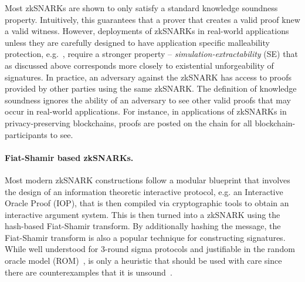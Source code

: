 Most zkSNARKs are shown to only satisfy a standard knowledge soundness property. Intuitively, this guarantees that
a prover that creates a valid proof knew a valid witness. However, deployments of zkSNARKs in real-world applications unless they are carefully designed to have application specific malleability protection, e.g.~\cite{SP:BCGGMT14}, require a stronger property -- \textit{simulation-extractability} (SE) that as discussed above corresponds more closely to existential unforgeability of signatures.
In practice, an adversary against the zkSNARK has access to proofs provided by other parties using the same
zkSNARK.  The definition of knowledge soundness ignores the ability of an adversary to see other valid proofs that may occur in real-world applications.  For instance, in applications of
zkSNARKs in privacy-preserving blockchains, proofs are posted on the chain for all
blockchain-participants to see.

\paragraph{Fiat-Shamir based zkSNARKs.}
Most modern zkSNARK constructions follow a modular blueprint that involves the design of an information theoretic interactive protocol, e.g. an Interactive Oracle Proof (IOP), that is then compiled via cryptographic tools to obtain an interactive argument system.  This is then turned into a zkSNARK using the hash-based Fiat-Shamir transform. By additionally hashing the message, the Fiat-Shamir transform is also a popular technique for constructing signatures. While well understood for 3-round sigma protocols and justifiable in the random oracle
model (ROM)~\cite{CCS:BelRog93}, is only a heuristic that should be used with
care since there are counterexamples that it is
unsound~\cite{FOCS:GolKal03}.

